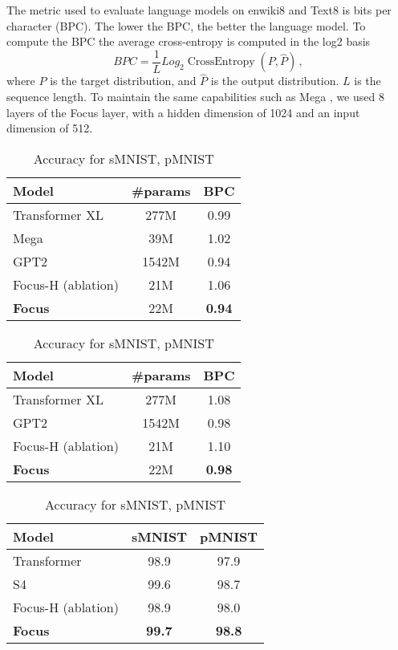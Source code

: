 \documentclass[11pt]{article}
\begin{document}
The metric used to evaluate language models on enwiki8 and Text8 is bits per character (BPC). The lower the BPC, the better the language model.
To compute the BPC the average cross-entropy is computed in the log2 basis
\begin{equation}
    BPC = \frac{1}{L}Log_2\operatorname{CrossEntropy}(P,\hat{P})\,,
\end{equation}
where $P$ is the target distribution, and $\hat{P}$ is the output distribution. $L$ is the sequence length.
To maintain the same capabilities such as Mega \cite{ma2022mega}, we used 8 layers of the Focus layer, with a hidden dimension of 1024 and an input dimension of 512. 

\begin{table}[t]
\centering
\caption{BPC for enwiki8 dataset.}
\begin{tabular}{@{}l@{~}c@{~}c@{}}
\toprule
Model & \#params &  BPC\\
\midrule
Transformer XL \cite{dai2019transformer} & 277M & 0.99\\
Mega \cite{ma2022mega} & 39M & 1.02\\
GPT2 \cite{Radford2019LanguageMA} & 1542M & 0.94\\
Focus-H (ablation)  & 21M & 1.06\\
\textbf{Focus}  & 22M & \textbf{0.94}\\
\bottomrule
\end{tabular}
\label{tab:enwiki8}
\smallskip
\smallskip
\smallskip


\centering
\caption{BPC for text8 dataset.}
\begin{tabular}{@{}l@{~}c@{~}c@{}}
\toprule
Model & \#params &  BPC\\
\midrule
Transformer XL \cite{dai2019transformer} & 277M & 1.08\\
GPT2 \cite{Radford2019LanguageMA} & 1542M & 0.98\\
Focus-H (ablation)  & 21M & 1.10\\
\textbf{Focus}  & 22M & \textbf{0.98}\\
\bottomrule
\end{tabular}
\label{tab:text8}
\smallskip
\smallskip
\smallskip


\caption{Accuracy for sMNIST, pMNIST}
\begin{tabular}{@{}l@{~}c@{~}c@{}}
\toprule
Model & sMNIST &  pMNIST\\
\midrule
Transformer& 98.9 & 97.9\\
S4 \cite{gu2021efficiently} & 99.6 & 98.7\\
Focus-H (ablation)  & 98.9 & 98.0\\
\textbf{Focus}  & \textbf{99.7} & \textbf{98.8}\\
\bottomrule
\end{tabular}
\label{tab:snpMNIST}
\end{table}
\end{document}
